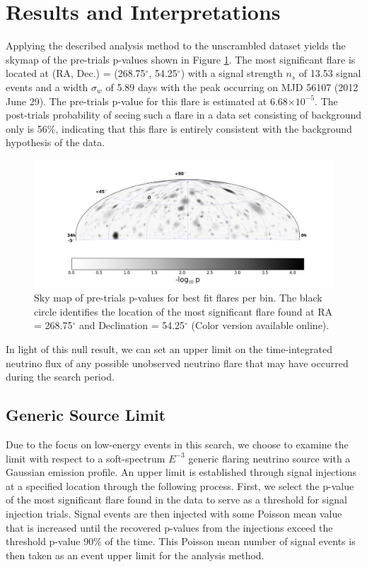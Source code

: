 \documentclass[manuscript]{aastex}
\begin{document}
\section{Results and Interpretations}
Applying the described analysis method to the unscrambled dataset yields the skymap of the pre-trials p-values shown in Figure \ref{fig:RealSkyMap}. The most significant flare is located at (RA, Dec.) = (268.75$^{\circ}$, 54.25$^{\circ}$) with a signal strength $n_s$ of 13.53 signal events and a width $\sigma_w$ of 5.89 days with the peak occurring on MJD 56107 (2012 June 29). The pre-trials p-value for this flare is estimated at 6.68$\times 10^{-5}$. The post-trials probability of seeing such a flare in a data set consisting of background only is 56$\%$, indicating that this flare is entirely consistent with the background hypothesis of the data.
\begin{figure}[ht]
  \begin{center}
    \includegraphics[width=1.0\textwidth,keepaspectratio]{plots/BW_RealSkyMap_Cut.png}
  \end{center}
  \caption[Results Sky Map]{Sky map of pre-trials p-values for best fit flares per bin. The black circle identifies the location of the most significant flare found at RA = 268.75$^\circ$ and Declination = 54.25$^\circ$ (Color version available online).}
  \label{fig:RealSkyMap}
\end{figure}
In light of this null result, we can set an upper limit on the time-integrated neutrino flux of any possible unobserved neutrino flare that may have occurred during the search period.
\subsection{Generic Source Limit}
Due to the focus on low-energy events in this search, we choose to examine the limit with respect to a soft-spectrum $E^{-3}$ generic flaring neutrino source with a Gaussian emission profile. An upper limit is established through signal injections at a specified location through the following process. First, we select the p-value of the most significant flare found in the data to serve as a threshold for signal injection trials. Signal events are then injected with some Poisson mean value that is increased until the recovered p-values from the injections exceed the threshold p-value 90$\%$ of the time. This Poisson mean number of signal events is then taken as an event upper limit for the analysis method.
\end{document}
